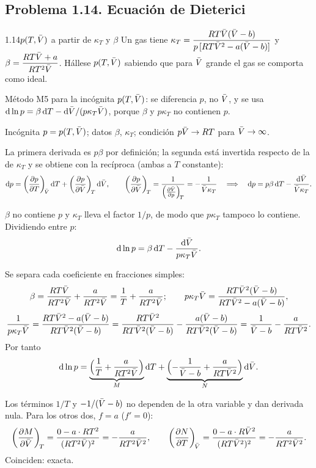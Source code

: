 \subsection{Problema 1.14. Ecuación de Dieterici}
\begin{problema}{1.14}{$p(T,\bar{V})$ a partir de $\kappa_T$ y $\beta$}
Un gas tiene $\displaystyle\kappa_T=\frac{RT\bar{V}(\bar{V}-b)}{p\,[RT\bar{V}^2-a(\bar{V}-b)]}$ y
$\displaystyle\beta=\frac{RT\bar{V}+a}{RT^2\bar{V}}$. Hállese $p(T,\bar{V})$ sabiendo que para $\bar{V}$ grande el gas se
comporta como ideal.
\end{problema}

\begin{resolucion}
\idea Método M5 para la incógnita $p(T,\bar{V})$: se diferencia $p$, no $\bar{V}$, y se usa
$\mathrm{d}\ln p=\beta\,\mathrm{d} T-\mathrm{d}\bar{V}/(p\kappa_T\bar{V})$, porque $\beta$ y $p\kappa_T$ no contienen $p$.

 Incógnita $p=p(T,\bar{V})$; datos $\beta$, $\kappa_T$; condición $p\bar{V}\to RT$
para $\bar{V}\to\infty$.

 La primera derivada es $p\beta$ por definición; la segunda está
invertida respecto de la de $\kappa_T$ y se obtiene con la recíproca (ambas a $T$ constante):
\[
  \mathrm{d} p=\left(\frac{\partial p}{\partial T}\right)_{\!\bar{V}}\mathrm{d} T+\left(\frac{\partial p}{\partial \bar{V}}\right)_{\!T}\mathrm{d}\bar{V},\qquad
  \left(\frac{\partial p}{\partial \bar{V}}\right)_{\!T}=\frac{1}{\left(\frac{\partial \bar{V}}{\partial p}\right)_{\!T}}=-\frac{1}{\bar{V}\kappa_T}
  \quad\Longrightarrow\quad\mathrm{d} p=p\beta\,\mathrm{d} T-\frac{\mathrm{d}\bar{V}}{\bar{V}\kappa_T}.
\]

 $\beta$ no contiene $p$ y $\kappa_T$ lleva el factor $1/p$, de modo que $p\kappa_T$
tampoco lo contiene. Dividiendo entre $p$:
\[
  \mathrm{d}\ln p=\beta\,\mathrm{d} T-\frac{\mathrm{d}\bar{V}}{p\kappa_T\bar{V}}.
\]

 Se separa cada coeficiente en fracciones simples:
\[
  \beta=\frac{RT\bar{V}}{RT^2\bar{V}}+\frac{a}{RT^2\bar{V}}=\frac1T+\frac{a}{RT^2\bar{V}};\qquad
  p\kappa_T\bar{V}=\frac{RT\bar{V}^2(\bar{V}-b)}{RT\bar{V}^2-a(\bar{V}-b)},
\]
\[
  \frac{1}{p\kappa_T\bar{V}}=\frac{RT\bar{V}^2-a(\bar{V}-b)}{RT\bar{V}^2(\bar{V}-b)}
  =\frac{RT\bar{V}^2}{RT\bar{V}^2(\bar{V}-b)}-\frac{a(\bar{V}-b)}{RT\bar{V}^2(\bar{V}-b)}=\frac{1}{\bar{V}-b}-\frac{a}{RT\bar{V}^2}.
\]
Por tanto
\[
  \mathrm{d}\ln p=\underbrace{\Bigl(\frac1T+\frac{a}{RT^2\bar{V}}\Bigr)}_{M}\mathrm{d} T
  +\underbrace{\Bigl(-\frac{1}{\bar{V}-b}+\frac{a}{RT\bar{V}^2}\Bigr)}_{N}\mathrm{d}\bar{V}.
\]

 Los términos $1/T$ y $-1/(\bar{V}-b)$ no dependen de la otra
variable y dan derivada nula. Para los otros dos, $f=a$ ($f'=0$):
\[
  \left(\frac{\partial M}{\partial \bar{V}}\right)_{\!T}=\frac{0-a\cdot RT^2}{(RT^2\bar{V})^2}=-\frac{a}{RT^2\bar{V}^2},\qquad
  \left(\frac{\partial N}{\partial T}\right)_{\!\bar{V}}=\frac{0-a\cdot R\bar{V}^2}{(RT\bar{V}^2)^2}=-\frac{a}{RT^2\bar{V}^2}.
\]
Coinciden: exacta.


\end{resolucion}
